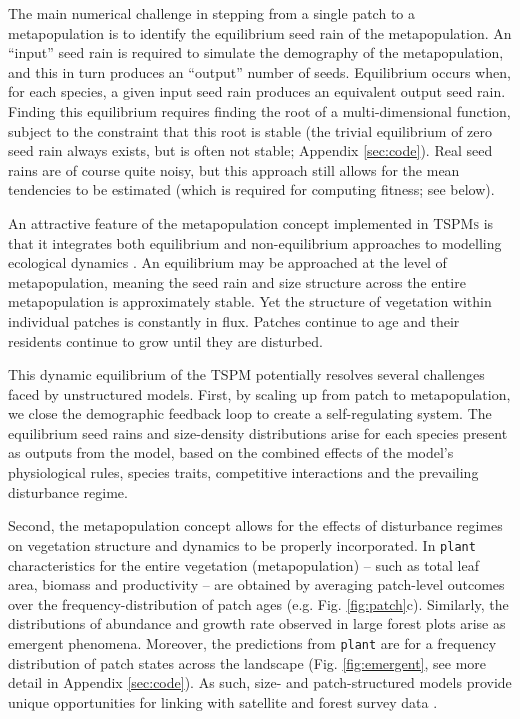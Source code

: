 \documentclass[a4paper,11pt]{article}
\newcommand{\plant}{\texttt{plant}}
\begin{document}
The main numerical challenge in stepping from a single patch to a
metapopulation is to identify the equilibrium seed rain of the
metapopulation. An ``input'' seed rain is required to simulate the
demography of the metapopulation, and this in turn produces an ``output''
number of seeds. Equilibrium occurs when, for each species,
a given input seed rain produces an equivalent output seed rain. Finding this equilibrium
requires finding the root of a multi-dimensional function, subject to
the constraint that this root is stable (the trivial equilibrium
of zero seed rain always exists, but is often not stable; Appendix
\ref{sec:code}).  Real seed rains are of course quite noisy,
but this approach still allows for the mean tendencies to be estimated (which is required for computing fitness; see below).

An attractive feature of the metapopulation concept implemented in \textsc{TSPMs}
is that it integrates both equilibrium and non-equilibrium approaches to
modelling ecological dynamics \citep{Kohyama-1993, Moorcroft-2001,
  Falster-2011}. An equilibrium may be approached at the level of
metapopulation, meaning the seed rain and size structure across the
entire metapopulation is approximately stable. Yet the structure of
vegetation within individual patches is constantly in flux. Patches
continue to age and their residents continue to grow until they are
disturbed.

This dynamic equilibrium of the \textsc{TSPM} potentially resolves several
challenges faced by unstructured models. First, by scaling up from
patch to metapopulation, we close the demographic feedback loop to
create a self-regulating system. The equilibrium seed rains and size-density distributions  arise for each species present as outputs from the model, based on the combined effects of the model's physiological rules, species traits, competitive interactions
and the prevailing disturbance regime.

Second, the metapopulation concept allows for the effects of disturbance
regimes on vegetation structure and dynamics to be properly incorporated. In
{\plant} characteristics for the entire vegetation (metapopulation) -- such
as total leaf area, biomass and productivity -- are obtained by averaging
patch-level outcomes over the frequency-distribution of patch ages (e.g.
Fig. \ref{fig:patch}c).  Similarly, the distributions of  abundance and growth rate
observed in large forest  plots \citep[e.g.][]{Muller-2006, Coomes-2007} arise
as  emergent phenomena. Moreover, the predictions from {\plant}
are for a frequency distribution of patch states across the landscape
(Fig. \ref{fig:emergent}, see more detail in Appendix \ref{sec:code}). As such,
size- and patch-structured models provide unique opportunities for linking with
satellite and forest survey data \citep{Moorcroft-2001, Purves-2008}.
\end{document}
